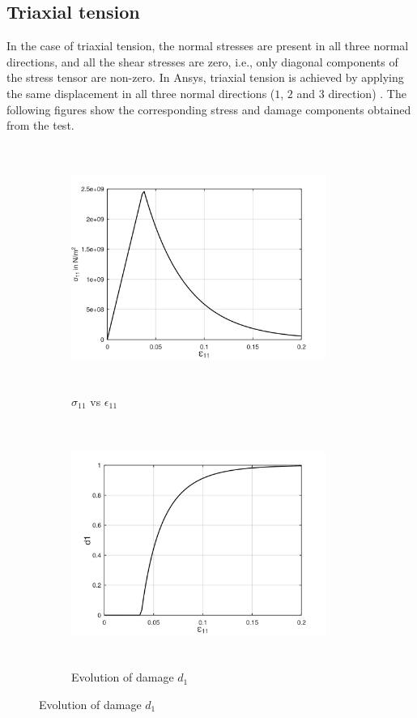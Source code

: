 \documentclass[12pt,a4paper,twoside,openright]{report}
\begin{document}
\subsection{Triaxial tension}
\indent\indent\indent In the case of triaxial tension, the normal stresses are present in all three normal directions, and all the shear stresses are zero, i.e., only diagonal components of the stress tensor are non-zero.  In Ansys, triaxial tension is achieved by applying the same displacement in all three normal directions ($1$, $2$ and $3$ direction) \citep{ubt}. The following figures show the corresponding stress and damage components obtained from the test.\\

\begin{figure}[htbp!]
       \captionsetup[subfigure]{justification=centering}
     \begin{subfigure}{0.4\textwidth}
         \includegraphics[width=8.3cm,height=8cm,keepaspectratio]{24.S11vsE11.png}
         \caption{$\sigma_{11}$ vs $\epsilon_{11}$}
         \label{fig:S11vsE11 2}
     \end{subfigure}
     \hspace{1.8cm}
     \captionsetup[subfigure]{justification=centering}
     \begin{subfigure}{0.4\textwidth}
         \includegraphics[width=8.3cm,height=8cm,keepaspectratio]{24.d1.png}
         \caption{Evolution of damage $d_{1}$}
         \label{fig:Evolution of damage d1 2}
     \end{subfigure}
\end{figure}
\end{document}
